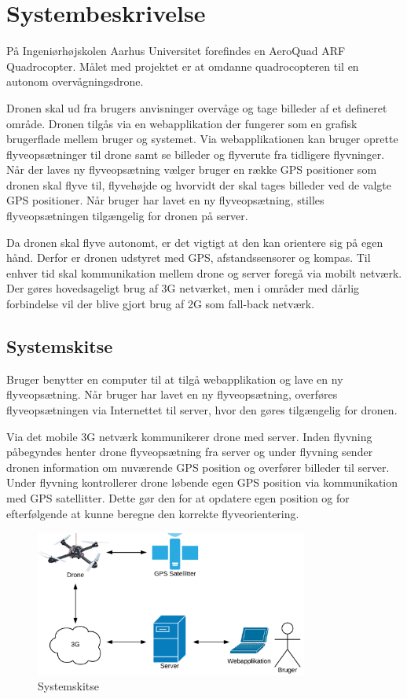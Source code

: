 \chapter{Systembeskrivelse}
\vspace{-1cm}
På Ingeniørhøjskolen Aarhus Universitet forefindes en AeroQuad ARF Quadrocopter. 
Målet med projektet er at omdanne quadrocopteren til en autonom overvågningsdrone.

Dronen skal ud fra brugers anvisninger overvåge og tage billeder af et defineret område. 
Dronen tilgås via en webapplikation der fungerer som en grafisk brugerflade mellem bruger og systemet.  Via webapplikationen kan bruger oprette flyveopsætninger til drone samt se billeder og flyverute fra tidligere flyvninger.  
Når der laves ny flyveopsætning vælger bruger en række GPS positioner som dronen skal flyve til, flyvehøjde og hvorvidt der skal tages billeder ved de valgte GPS positioner. Når bruger har lavet en ny flyveopsætning, stilles flyveopsætningen tilgængelig for dronen på server.  

Da dronen skal flyve autonomt, er det vigtigt at den kan orientere sig på egen hånd. Derfor er dronen udstyret med GPS, afstandssensorer og kompas.
Til enhver tid skal kommunikation mellem drone og server foregå via mobilt netværk. Der gøres hovedsageligt brug af 3G netværket, men i områder med dårlig forbindelse vil der blive gjort brug af 2G som fall-back netværk. 

\vspace{-0.5cm}

\section*{Systemskitse}
\vspace{-0.5cm}
Bruger benytter en computer til at tilgå webapplikation og lave en ny flyveopsætning. Når bruger har lavet en ny flyveopsætning, overføres flyveopsætningen via Internettet til server, hvor den gøres tilgængelig for dronen.
 
Via det mobile 3G netværk kommunikerer drone med server. 
Inden flyvning påbegyndes henter drone flyveopsætning fra server og under flyvning sender dronen information om nuværende GPS position og overfører billeder til server. 
Under flyvning kontrollerer drone løbende egen GPS position via kommunikation med GPS satellitter. Dette gør den for at opdatere egen position og for efterfølgende at kunne beregne den korrekte flyveorientering. 



\vspace{-5pt}
\begin{figure}[H]
\centering
\includegraphics[width=0.8\textwidth]{Billeder/Projektbeskrivelse.png}
\vspace{-.3cm}
\caption{Systemskitse}
\label{fig:Systemskitse}
\end{figure}